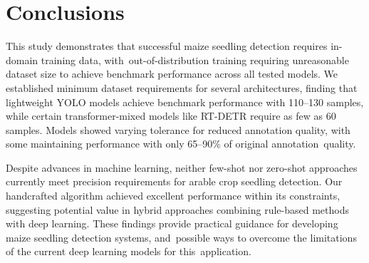 \documentclass[12pt,a4paper,oneside]{report}
\begin{document}
\section{Conclusions}

This study demonstrates that successful maize seedling detection requires in-domain 
training data, with~out-of-distribution training requiring unreasonable dataset size to 
achieve benchmark performance across all tested models. 
We established minimum dataset requirements for several 
architectures, finding that lightweight YOLO models achieve benchmark performance 
with 110--130 samples, while certain transformer-mixed models like RT-DETR require as 
few as 60 samples. Models showed varying tolerance for reduced annotation quality, 
with some maintaining performance with only 65--90\% of original annotation~quality.

Despite advances in machine learning, neither few-shot nor zero-shot approaches currently 
meet precision requirements for arable crop seedling detection. Our handcrafted 
algorithm achieved excellent performance within its constraints, suggesting potential 
value in hybrid approaches combining rule-based methods with deep learning. These 
findings provide practical guidance for developing maize seedling detection 
systems, and~possible ways to overcome the limitations of the current deep learning
models for this~application.
 



\vspace{6pt} 


\end{document}
